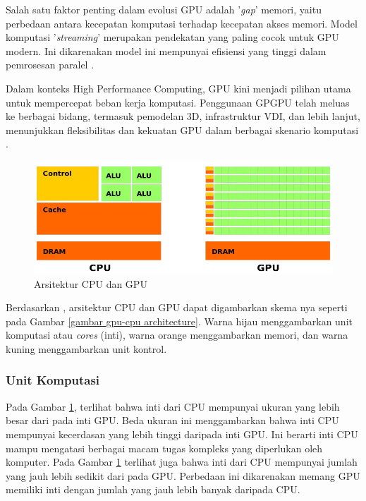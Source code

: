 
Salah satu faktor penting dalam evolusi GPU adalah '\emph{gap}' memori, yaitu
perbedaan antara kecepatan komputasi terhadap kecepatan akses memori. Model
komputasi '\emph{streaming}' merupakan pendekatan yang paling cocok untuk GPU
modern. Ini dikarenakan model ini mempunyai efisiensi yang tinggi dalam
pemrosesan paralel \citep{pharrGPUGemsProgramming2005}.


Dalam konteks High Performance Computing, GPU kini menjadi pilihan utama untuk
mempercepat beban kerja komputasi. Penggunaan GPGPU telah meluas ke berbagai
bidang, termasuk pemodelan 3D, infrastruktur VDI, dan lebih lanjut, menunjukkan
fleksibilitas dan kekuatan GPU dalam berbagai skenario komputasi
\citep{hagoortExploringGPUArchitecture2023}.

\begin{figure}[H]
	\centering
	\includegraphics[width=14cm]{images/cpu-gpu-architecture.png}
	\caption{Arsitektur CPU dan GPU}
	\label{gambar gpu-cpu architecture}
\end{figure}

Berdasarkan \cite{learningUnderstandingArchitectureGPU2023}, arsitektur CPU dan
GPU dapat digambarkan skema nya seperti pada Gambar \ref{gambar gpu-cpu
	architecture}. Warna hijau menggambarkan unit komputasi atau \emph{cores}
(inti), warna orange menggambarkan memori, dan warna kuning menggambarkan unit
kontrol.

\subsubsection{Unit Komputasi}
\label{unit komputasi}

Pada Gambar \ref{gambar gpu-cpu architecture}, terlihat bahwa inti dari CPU
mempunyai ukuran yang lebih besar dari pada inti GPU. Beda ukuran ini
menggambarkan bahwa inti CPU mempunyai kecerdasan yang lebih tinggi daripada
inti GPU. Ini berarti inti CPU mampu mengatasi berbagai macam tugas kompleks
yang diperlukan oleh komputer. Pada Gambar \ref{gambar gpu-cpu architecture}
terlihat juga bahwa inti dari CPU mempunyai jumlah yang jauh lebih sedikit dari
pada GPU. Perbedaan ini dikarenakan memang GPU memiliki inti dengan jumlah yang
jauh lebih banyak daripada CPU.

